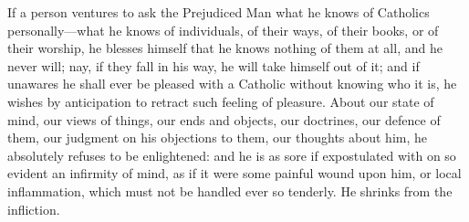 If a person ventures to ask the Prejudiced Man what he
knows of Catholics personally—what he knows of
individuals, of their ways, of their books, or of their
worship, he blesses himself that he knows nothing of them
at all, and he never will; nay, if they fall in his way,
he will take himself out of it; and if unawares he shall
ever be pleased with a Catholic without knowing who it
is, he wishes by anticipation to retract such feeling of
pleasure. About our state of mind, our views of things,
our ends and objects, our doctrines, our defence of them,
our judgment on his objections to them, our thoughts
about him, he absolutely refuses to be enlightened: and
he is as sore if expostulated with on so evident an
infirmity of mind, as if it were some painful wound upon
him, or local inflammation, which must not be handled
ever so tenderly. He shrinks from the infliction.

